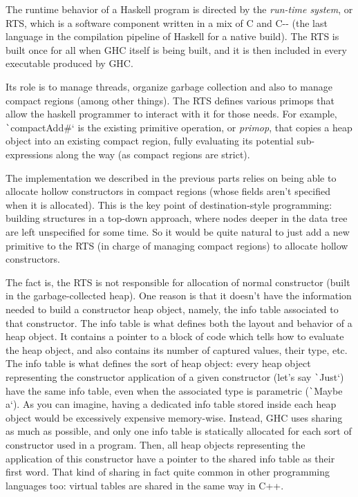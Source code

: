 \documentclass[english]{jflart}
\begin{document}
The runtime behavior of a Haskell program is directed by the \emph{run-time system}, or RTS, which is a software component written in a mix of C and C-{}- (the last language in the compilation pipeline of Haskell for a native build). The RTS is built once for all when GHC itself is being built, and it is then included in every executable produced by GHC.

Its role is to manage threads, organize garbage collection and also to manage compact regions (among other things). The RTS defines various primops that allow the haskell programmer to interact with it for those needs. For example, \texttt`compactAdd#` is the existing primitive operation, or \emph{primop}, that copies a heap object into an existing compact region, fully evaluating its potential sub-expressions along the way (as compact regions are strict).

The implementation we described in the previous parts relies on being able to allocate hollow constructors in compact regions (whose fields aren't specified when it is allocated). This is the key point of destination-style programming: building structures in a top-down approach, where nodes deeper in the data tree are left unspecified for some time. So it would be quite natural to just add a new primitive to the RTS (in charge of managing compact regions) to allocate hollow constructors.

The fact is, the RTS is not responsible for allocation of normal constructor (built in the garbage-collected heap). One reason is that it doesn't have the information needed to build a constructor heap object, namely, the info table associated to that constructor. The info table is what defines both the layout and behavior of a heap object. It contains a pointer to a block of code which tells how to evaluate the heap object, and also contains its number of captured values, their type, etc. The info table is what defines the sort of heap object: every heap object representing the constructor application of a given constructor (let's say \texttt`Just`) have the same info table, even when the associated type is parametric (\texttt`Maybe a`). As you can imagine, having a dedicated info table stored inside each heap object would be excessively expensive memory-wise. Instead, GHC uses sharing as much as possible, and only one info table is statically allocated for each sort of constructor used in a program. Then, all heap objects representing the application of this constructor have a pointer to the shared info table as their first word. That kind of sharing in fact quite common in other programming languages too: virtual tables are shared in the same way in C++.
\end{document}
